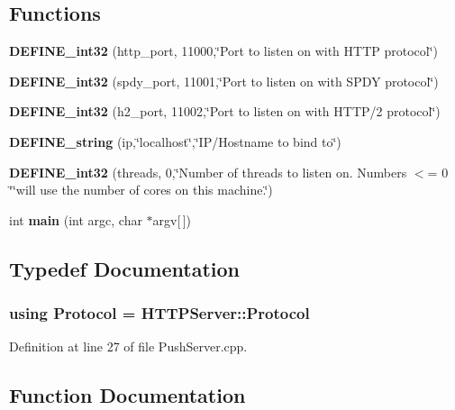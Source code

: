 \subsection*{Functions}
\begin{DoxyCompactItemize}
\item 
{\bf D\+E\+F\+I\+N\+E\+\_\+int32} (http\+\_\+port, 11000,\char`\"{}Port to listen on with H\+T\+TP protocol\char`\"{})
\item 
{\bf D\+E\+F\+I\+N\+E\+\_\+int32} (spdy\+\_\+port, 11001,\char`\"{}Port to listen on with S\+P\+DY protocol\char`\"{})
\item 
{\bf D\+E\+F\+I\+N\+E\+\_\+int32} (h2\+\_\+port, 11002,\char`\"{}Port to listen on with H\+T\+TP/2 protocol\char`\"{})
\item 
{\bf D\+E\+F\+I\+N\+E\+\_\+string} (ip,\char`\"{}localhost\char`\"{},\char`\"{}IP/Hostname to bind to\char`\"{})
\item 
{\bf D\+E\+F\+I\+N\+E\+\_\+int32} (threads, 0,\char`\"{}Number of threads to listen on. Numbers $<$= 0 \char`\"{}\char`\"{}will use the number of cores on this machine.\char`\"{})
\item 
int {\bf main} (int argc, char $\ast$argv[$\,$])
\end{DoxyCompactItemize}


\subsection{Typedef Documentation}
\subsubsection[{Protocol}]{\setlength{\rightskip}{0pt plus 5cm}using {\bf Protocol} =  {\bf H\+T\+T\+P\+Server\+::\+Protocol}}\label{PushServer_8cpp_a0c4543274a4aa8135167669efe8688c7}


Definition at line 27 of file Push\+Server.\+cpp.



\subsection{Function Documentation}
